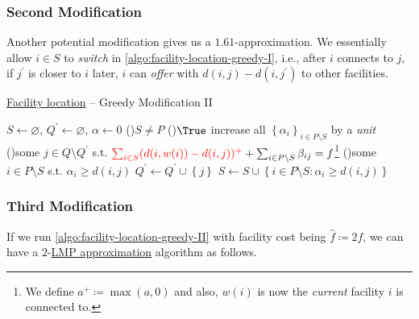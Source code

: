 \subsubsection{Second Modification}
Another potential modification gives us a \(1.61\)-approximation. We essentially allow \(i\in S\) to \emph{switch} in \autoref{algo:facility-location-greedy-I}, i.e., after \(i\) connects to \(j\), if \(j^\prime \) is closer to \(i\) later, \(i\) can \emph{offer} with \(d(i, j) - d(i, j^\prime )\) to other facilities.

\begin{algorithm}[H]\label{algo:facility-location-greedy-II}
	\DontPrintSemicolon
	\caption{\hyperref[prb:facility-location]{Facility location} -- Greedy Modification II}
	\BlankLine
	\(S\gets \varnothing \), \(Q^\prime \gets \varnothing \), \(\alpha \gets 0\) 
	\;
	\While(){\(S \neq P\)}{
	\While(){\(\True\)}{
	increase all \(\left\{ \alpha _i \right\}_{i\in P\setminus S} \) by a \emph{unit}\;
	\If(){some \(j\in Q\setminus Q^\prime \) s.t. \(\mathcolor{red}{\sum_{i\in S} (d(i, w(i)) - d(i, j))^+ } + \sum_{i\in P\setminus S} \beta _{ij} = f\)\footnote{We define \(a^+ \coloneqq \max (a, 0)\) and also, \(w(i)\) is now the \emph{current} facility \(i\) is connected to.}}{
			\Break
		}
		\If(){some \(i\in P\setminus S\) s.t. \(\alpha_i \geq d(i, j)\)}{
			\Break
		}
	}
	\(Q^\prime \gets Q^\prime  \cup \left\{ j \right\} \)
	\(S\gets S \cup \left\{ i\in P\setminus S\colon \alpha _i \geq d(i, j)\right\} \)
	}
	\;
\end{algorithm}

\subsubsection{Third Modification}
If we run \autoref{algo:facility-location-greedy-II} with facility cost being \(\hat{f} \coloneqq 2f\), we can have a \(2\)-\hyperref[def:LMP]{LMP approximation} algorithm as follows.

